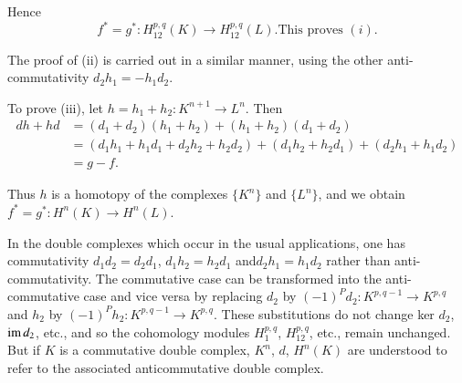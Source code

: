 Hence
$$
f^\ast = g^\ast :  H^{p, q}_{12} (K) \rightarrow  H^{p, q}_{12} (L). \text {
  This proves } (i). 
$$

The proof of (ii) is carried out in a similar manner, using the
other anti-commutativity $d_2 h_1 = - h_1 d_2$. 

To prove (iii), let $h = h_1 + h_2 : K^{n+1} \rightarrow L^n$. Then 
\begin{align*}
dh + hd & =(d_1 + d_2) (h_1 + h_2) + (h_1 + h_2) (d_1 + d_2)\\ 
& = (d_1 h_1 + h_1 d_1 + d_2 h_2 + h_2 d_2) + (d_1 h_2 + h_2 d_1) +
(d_2 h_1 + h_1 d_2)\\ 
& = g-f.
\end{align*}

Thus $h$ is a homotopy of the complexes $\big\{ K^n \big\}$ and
$\big\{ L^n \big\}$, and we obtain $f^\ast = g^\ast : H^n(K) \rightarrow H^n
(L)$. 
  
  \begin{note*}%
In the double complexes which occur in the usual applications, one has
commutativity $d_1 d_2 = d_2 d_1$, $d_1 h_2 = h_2 d_1$
and\pageoriginale $d_2 h_1 = 
h_1 d_2$ rather than anti-commutativity. The commutative case can be
transformed into the anti-commutative case and vice versa by replacing
$d_2 $ by $(-1)^P d_2 : K^{p,q-1} \rightarrow K^{p,q}$ and $h_2$ by
$(-1)^P h_2 : K^{p,q-1} \rightarrow K^{p,q}$. These substitutions do
not change ker $d_2$, $\operatorname{im} d_2$, etc., and so the cohomology modules
$H^{p,q}_{1}$, $H^{p,q}_{12}$, etc., remain unchanged. But if $K$ is a
commutative double complex, $K^n$, $d$, $H^n(K)$ are understood to refer
to the associated anticommutative double complex. 
\end{note*}  
  
